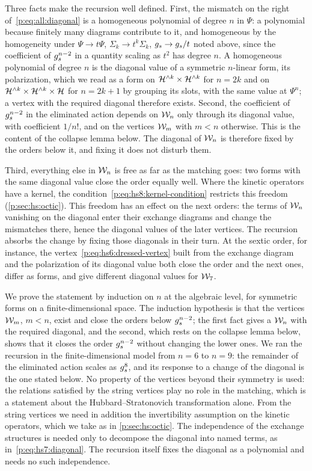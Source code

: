 Three facts make the recursion well defined.
First, the mismatch on the right of~\eqref{p:eq:all:diagonal} is a homogeneous polynomial of degree $n$ in $\Psi$: a polynomial because finitely many diagrams contribute to it, and homogeneous by the homogeneity under $\Psi \to t \Psi$, $\Sigma_k \to t^k \Sigma_k$, $g_s \to g_s / t$ noted above, since the coefficient of $g_s^{n - 2}$ in a quantity scaling as $t^2$ has degree $n$.
A homogeneous polynomial of degree $n$ is the diagonal value of a symmetric $n$-linear form, its polarization, which we read as a form on $\mathcal{H}^{\wedge k} \times \mathcal{H}^{\wedge k}$ for $n = 2 k$ and on $\mathcal{H}^{\wedge k} \times \mathcal{H}^{\wedge k} \times \mathcal{H}$ for $n = 2 k + 1$ by grouping its slots, with the same value at $\Psi^n$; a vertex with the required diagonal therefore exists.
Second, the coefficient of $g_s^{n - 2}$ in the eliminated action depends on $\mathcal{W}_{n}$ only through its diagonal value, with coefficient $1 / n!$, and on the vertices $\mathcal{W}_{m}$ with $m < n$ otherwise.
This is the content of the collapse lemma below.
The diagonal of $\mathcal{W}_{n}$ is therefore fixed by the orders below it, and fixing it does not disturb them.

Third, everything else in $\mathcal{W}_{n}$ is free as far as the matching goes: two forms with the same diagonal value close the order equally well.
Where the kinetic operators have a kernel, the condition~\eqref{p:eq:hs8:kernel-condition} restricts this freedom (\cref{p:sec:hs:octic}).
This freedom has an effect on the next orders: the terms of $\mathcal{W}_{n}$ vanishing on the diagonal enter their exchange diagrams and change the mismatches there, hence the diagonal values of the later vertices.
The recursion absorbs the change by fixing those diagonals in their turn.
At the sextic order, for instance, the vertex~\eqref{p:eq:hs6:dressed-vertex} built from the exchange diagram and the polarization of its diagonal value both close the order and the next ones, differ as forms, and give different diagonal values for $\mathcal{W}_{7}$.

We prove the statement by induction on $n$ at the algebraic level, for symmetric forms on a finite-dimensional space.
The induction hypothesis is that the vertices $\mathcal{W}_{m}$, $m < n$, exist and close the orders below $g_s^{n - 2}$; the first fact gives a $\mathcal{W}_{n}$ with the required diagonal, and the second, which rests on the collapse lemma below, shows that it closes the order $g_s^{n - 2}$ without changing the lower ones.
We ran the recursion in the finite-dimensional model from $n = 6$ to $n = 9$: the remainder of the eliminated action scales as $g_s^8$, and its response to a change of the diagonal is the one stated below.
No property of the vertices beyond their symmetry is used: the relations satisfied by the string vertices play no role in the matching, which is a statement about the Hubbard--Stratonovich transformation alone.
From the string vertices we need in addition the invertibility assumption on the kinetic operators, which we take as in \cref{p:sec:hs:octic}.
The independence of the exchange structures is needed only to decompose the diagonal into named terms, as in~\eqref{p:eq:hs7:diagonal}.
The recursion itself fixes the diagonal as a polynomial and needs no such independence.

